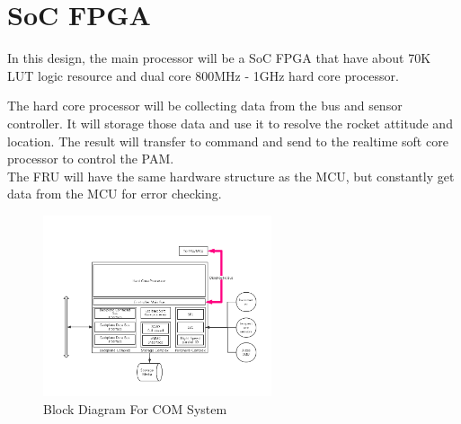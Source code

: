 \documentclass[12pt,article]{memoir}
\begin{document}
\section{SoC FPGA}
In this design, the main processor will be a SoC FPGA that have about 70K LUT logic resource and dual core 800MHz - 1GHz hard core processor.
\begin{table}[H]
	\centering
	\caption{Table of Logic Resource}
	\label{tab:rev}
\end{table}
The hard core processor will be collecting data from the bus and sensor controller. It will storage those data and use it to resolve the rocket attitude and location. The result will transfer to command and send to the realtime soft core processor to control the PAM.\\
The FRU will have the same hardware structure as the MCU, but constantly get data from the MCU for error checking.
\begin{center}
\begin{figure}[htp]
\begin{center}
\includegraphics[width=0.6\textwidth]{img/DR00003_Plan1.png}
 \caption{Block Diagram For COM System}	
\end{center}
\end{figure}
\end{center}

\end{document}

